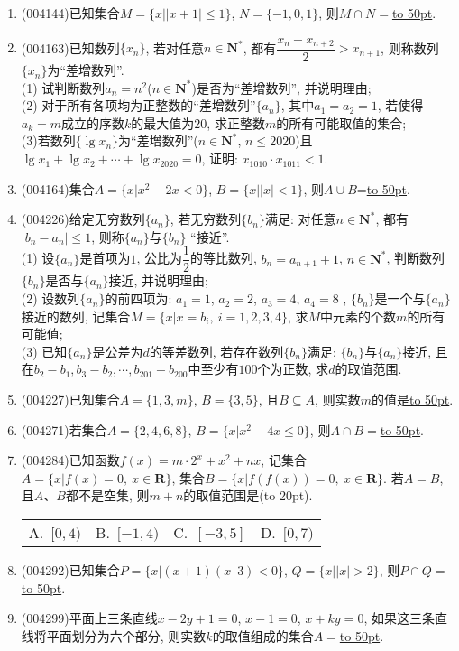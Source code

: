 \documentclass[10pt,a4paper]{article}
\newcommand{\blank}[1]{\underline{\hbox to #1pt{}}}
\newcommand{\bracket}[1]{(\hbox to #1pt{})}
\newcommand{\fourch}[4]{\par\begin{tabular}{p{.23\textwidth}p{.23\textwidth}p{.23\textwidth}p{.23\textwidth}}
A.~#1 &B.~#2& C.~#3& D.~#4
\end{tabular}}
\begin{document}
\begin{enumerate}[1.]
\item {\tiny (004144)}已知集合$M=\{x||x+1|\le 1\}$, $N=\{-1,0,1\}$, 则$M\cap N=$\blank{50}.
\item {\tiny (004163)}已知数列$\{x_n\}$, 若对任意$n\in \mathbf{N}^*$, 都有$\dfrac{x_n+x_{n+2}}2>x_{n+1}$, 则称数列$\{x_n\}$为``差增数列''.\\
(1) 试判断数列$a_n=n^2$($n\in \mathbf{N}^*$)是否为``差增数列'', 并说明理由;\\
(2) 对于所有各项均为正整数的``差增数列''$\{a_n\}$, 其中$a_1=a_2=1$, 若使得$a_k=m$成立的序数$k$的最大值为$20$, 求正整数$m$的所有可能取值的集合;\\
(3)若数列$\{\lg x_n\}$为``差增数列''($n\in \mathbf{N}^*$, $n\le 2020$)且$\lg x_1+\lg x_2+\cdots +\lg x_{2020}=0$, 证明: $x_{1010}\cdot x_{1011}<1$.
\item {\tiny (004164)}集合$A=\{x|x^2-2x<0\}$, $B=\{x||x|<1\}$, 则$A\cup B$=\blank{50}.
\item {\tiny (004226)}给定无穷数列$\{a_n\}$, 若无穷数列$\{b_n\}$满足: 对任意$n\in \mathbf{N}^*$, 都有$|b_n-a_n|\le 1$, 则称$\{a_n\}$与$\{b_n\}$ ``接近''.\\
(1) 设$\{a_n\}$是首项为$1$, 公比为$\dfrac 12$的等比数列, $b_n=a_{n+1}+1$, $n\in \mathbf{N}^*$, 判断数列$\{b_n\}$是否与$\{a_n\}$接近, 并说明理由;\\
(2) 设数列$\{a_n\}$的前四项为: $a_1=1$, $a_2=2$, $a_3=4$, $a_4=8$ , $\{b_n\}$是一个与$\{a_n\}$接近的数列, 记集合$M=\{x|x=b_i,\ i=1,2,3,4\}$, 求$M$中元素的个数$m$的所有可能值;\\
(3) 已知$\{a_n\}$是公差为$d$的等差数列, 若存在数列$\{b_n\}$满足: $\{b_n\}$与$\{a_n\}$接近, 且在$b_2-b_1,b_3-b_2,\cdots,b_{201}-b_{200}$中至少有$100$个为正数, 求$d$的取值范围.
\item {\tiny (004227)}已知集合$A=\{1,3,m\}$, $B=\{3,5\}$, 且$B\subseteq A$, 则实数$m$的值是\blank{50}.
\item {\tiny (004271)}若集合$A=\{2,4,6,8\}$, $B=\{x|x^2-4x\le 0\}$, 则$A\cap B=$\blank{50}.
\item {\tiny (004284)}已知函数$f(x)=m\cdot 2^x+x^2+nx$, 记集合$A=\{x|f(x)=0, \ x\in \mathbf{R}\}$, 集合$B=\{x|f(f(x))=0, \ x\in \mathbf{R}\}$.
若$A=B$, 且$A$、$B$都不是空集, 则$m+n$的取值范围是\bracket{20}.
\fourch{$[0,4)$}{$[-1,4)$}{$[-3,5]$}{$[0,7)$}
\item {\tiny (004292)}已知集合$P=\{x|(x+1)(x–3)<0\}$, $Q=\{x||x|>2\}$, 则$P\cap Q=$\blank{50}.
\item {\tiny (004299)}平面上三条直线$x-2y+1=0$, $x-1=0$, $x+ky=0$, 如果这三条直线将平面划分为六个部分, 则实数$k$的取值组成的集合$A=$\blank{50}.

\end{enumerate}
\end{document}
